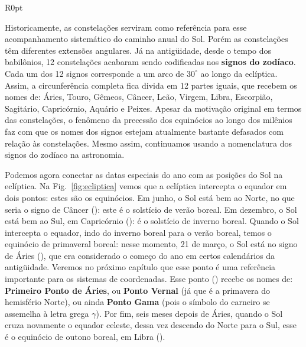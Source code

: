 \begin{wrapfigure}{R}{0pt}

\caption{Relação entre a eclíptica e o equador celeste.}
\label{fig:ecliptica}
\end{wrapfigure}

Historicamente, as constelações serviram como referência para esse acompanhamento sistemático do caminho anual do Sol. Porém as constelações têm diferentes extensões angulares. Já na antigüidade, desde o tempo dos babilônios, 12 constelações acabaram sendo codificadas nos \textbf{signos do zodíaco}. Cada um dos 12 signos corresponde a um arco de $30^{\circ}$ ao longo da eclíptica. Assim, a circunferência completa fica divida em 12 partes iguais, que recebem os nomes de: Áries, Touro, Gêmeos, Câncer, Leão, Virgem, Libra, Escorpião, Sagitário, Capricórnio, Aquário e Peixes. Apesar da motivação original em termos das constelações, o fenômeno da precessão dos equinócios ao longo dos milênios faz com que os nomes dos signos estejam atualmente bastante defasados com relação às constelações. Mesmo assim, continuamos usando a nomenclatura dos signos do zodíaco na astronomia.

Podemos agora conectar as datas especiais do ano com as posições do Sol na eclíptica. Na Fig.~\ref{fig:ecliptica} vemos que a eclíptica intercepta o equador em dois pontos: estes são os equinócios. Em junho, o Sol está bem ao Norte, no que seria o signo de Câncer (\Cancer): este é o solstício de verão boreal. Em dezembro, o Sol está bem ao Sul, em Capricórnio (\Capricorn): é o solstício de inverno boreal. Quando o Sol intercepta o equador, indo do inverno boreal para o verão boreal, temos o equinócio de primaveral boreal: nesse momento, 21 de março, o Sol está no signo de Áries (\Aries), que era considerado o começo do ano em certos calendários da antigüidade. Veremos no próximo capítulo que esse ponto é uma referência importante para os sistemas de coordenadas. Esse ponto (\Aries) recebe os nomes de: \textbf{Primeiro Ponto de Áries}, ou \textbf{Ponto Vernal} (já que é a primavera do hemisfério Norte), ou ainda \textbf{Ponto Gama} (pois o símbolo do carneiro se assemelha à letra grega $\gamma$). Por fim, seis meses depois de Áries, quando o Sol cruza novamente o equador celeste, dessa vez descendo do Norte para o Sul, esse é o equinócio de outono boreal, em Libra (\Libra).


